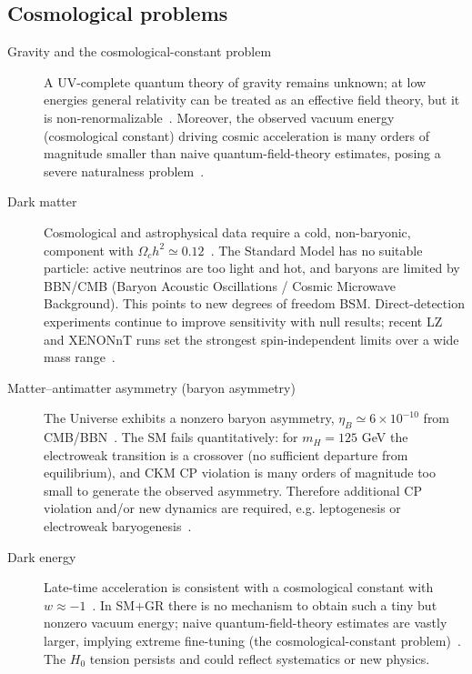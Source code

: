 \subsection{Cosmological problems}
\begin{description}
		\item[Gravity and the cosmological-constant problem] A UV-complete quantum theory of gravity remains unknown; at low energies general relativity can be treated as an effective field theory, but it is non-renormalizable~\parencite{Donoghue:1994EFT,Burgess:2004QG}. Moreover, the observed vacuum energy (cosmological constant) driving cosmic acceleration is many orders of magnitude smaller than naive quantum-field-theory estimates, posing a severe naturalness problem~\parencite{Weinberg:1989CC}.

  \item[Dark matter] Cosmological and astrophysical data require a cold, non-baryonic,  component with $\Omega_c h^2 \simeq 0.12$~\parencite{Planck2018}. The Standard Model has no suitable particle: active neutrinos are too light and hot, and baryons are limited by BBN/CMB (Baryon Acoustic Oscillations / Cosmic Microwave Background). This points to new degrees of freedom BSM. Direct-detection experiments continue to improve sensitivity with null results; recent LZ and XENONnT runs set the strongest spin-independent limits over a wide mass range~\parencite{LZ:2022first,LZ:2023full,XENONnT:2023}.

  \item[Matter--antimatter asymmetry (baryon asymmetry)] The Universe exhibits a nonzero baryon asymmetry, $\eta_B \simeq 6\times10^{-10}$ from CMB/BBN~\parencite{Planck2018}. The SM fails quantitatively: for $m_H=125$ GeV the electroweak transition is a crossover (no sufficient departure from equilibrium), and CKM CP violation is many orders of magnitude too small to generate the observed asymmetry. Therefore additional CP violation and/or new dynamics are required, e.g. leptogenesis or electroweak baryogenesis~\parencite{Sakharov:1967,Davidson:2008Leptogenesis,Morrissey:2012EWB}.

  \item[Dark energy] Late-time acceleration is consistent with a cosmological constant with $w\approx -1$~\parencite{DESIY1:2024}. In SM+GR there is no mechanism to obtain such a tiny but nonzero vacuum energy; naive quantum-field-theory estimates are vastly larger, implying extreme fine-tuning (the cosmological-constant problem)~\parencite{Weinberg:1989CC}. The $H_0$ tension persists and could reflect systematics or new physics.
\end{description}

